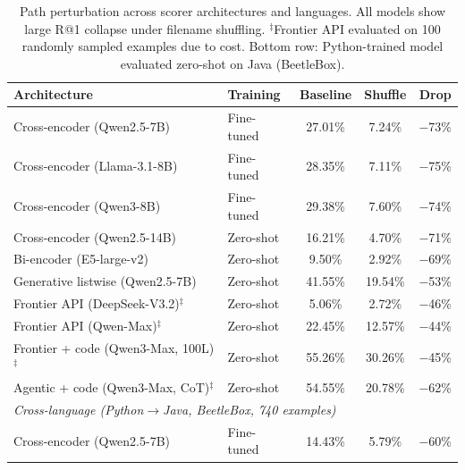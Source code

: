 \documentclass{article}
\begin{document}
\begin{table}[h]
\centering
\caption{Path perturbation across scorer architectures and languages. All models show large R@1 collapse under filename shuffling. $^\ddagger$Frontier API evaluated on 100 randomly sampled examples due to cost. Bottom row: Python-trained model evaluated zero-shot on Java (BeetleBox).}
\label{tab:cross_architecture}
\small
\begin{tabular}{llccc}
\toprule
\textbf{Architecture} & \textbf{Training} & \textbf{Baseline} & \textbf{Shuffle} & \textbf{Drop} \\
\midrule
Cross-encoder (Qwen2.5-7B) & Fine-tuned & 27.01\% & 7.24\% & $-$73\% \\
Cross-encoder (Llama-3.1-8B) & Fine-tuned & 28.35\% & 7.11\% & $-$75\% \\
Cross-encoder (Qwen3-8B) & Fine-tuned & 29.38\% & 7.60\% & $-$74\% \\
\midrule
Cross-encoder (Qwen2.5-14B) & Zero-shot & 16.21\% & 4.70\% & $-$71\% \\
Bi-encoder (E5-large-v2) & Zero-shot & 9.50\% & 2.92\% & $-$69\% \\
Generative listwise (Qwen2.5-7B) & Zero-shot & 41.55\% & 19.54\% & $-$53\% \\
\midrule
Frontier API (DeepSeek-V3.2)$^\ddagger$ & Zero-shot & 5.06\% & 2.72\% & $-$46\% \\
Frontier API (Qwen-Max)$^\ddagger$ & Zero-shot & 22.45\% & 12.57\% & $-$44\% \\
Frontier + code (Qwen3-Max, 100L)$^\ddagger$ & Zero-shot & 55.26\% & 30.26\% & $-$45\% \\
Agentic + code (Qwen3-Max, CoT)$^\ddagger$ & Zero-shot & 54.55\% & 20.78\% & $-$62\% \\
\midrule
\multicolumn{5}{l}{\emph{Cross-language (Python$\to$Java, BeetleBox, 740 examples)}} \\
Cross-encoder (Qwen2.5-7B) & Fine-tuned & 14.43\% & 5.79\% & $-$60\% \\
\bottomrule
\end{tabular}
\end{table}
\end{document}
